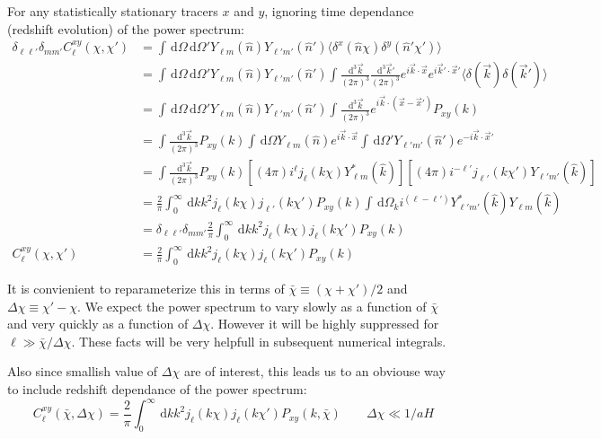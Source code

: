 \documentclass[onecolumn,prd,nofootinbib]{revtex4-1}
\newcommand{\ud}{\,\mathrm{d}}
\begin{document}
For any statistically stationary tracers $x$ and $y$,
ignoring time dependance (redshift evolution)
of the power spectrum:
\begin{align}
    \delta_{\ell\ell'}\delta_{mm'}C^{xy}_\ell(\chi, \chi')
    &= \int\ud\Omega\ud\Omega'Y_{\ell m}(\hat n) Y_{\ell' m'}(\hat n')
        \langle \delta^x(\hat n \chi) \delta^y(\hat n' \chi') \rangle
        \\
    &=
        \int\ud\Omega\ud\Omega'Y_{\ell m}(\hat n) Y_{\ell' m'}(\hat n')
        \int\frac{\ud^3\vec k}{(2 \pi)^3} \frac{\ud^3\vec k'}{(2 \pi)^3}
        e^{i\vec k \cdot \vec x} e^{i\vec k' \cdot \vec x'}
        \langle \delta(\vec k) \delta(\vec k') \rangle
        \\
    &=
        \int\ud\Omega\ud\Omega'Y_{\ell m}(\hat n) Y_{\ell' m'}(\hat n')
        \int\frac{\ud^3\vec k}{(2 \pi)^3} 
        e^{i\vec k \cdot (\vec x - \vec x')} P_{xy}(k)
        \\
    &=
        \int\frac{\ud^3\vec k}{(2 \pi)^3} P_{xy}(k)
        \int\ud\Omega Y_{\ell m}(\hat n)
        e^{i\vec k \cdot \vec x}
        \int\ud\Omega' Y_{\ell' m'}(\hat n')
        e^{-i\vec k \cdot \vec x'}
        \\
    &=
        \int\frac{\ud^3\vec k}{(2 \pi)^3} P_{xy}(k)
        \left[(4 \pi) i^\ell j_\ell(k\chi) Y_{\ell m}^*(\hat k)\right]
        \left[(4 \pi) i^{-\ell'} j_{\ell'}(k\chi') Y_{\ell' m'}(\hat
        k)\right]
        \\
    &=
        \frac{2}{\pi}
        \int_0^\infty\ud k k^2 j_\ell(k\chi) j_{\ell'}(k\chi')P_{xy}(k)
        \int\ud \Omega_k i^{(\ell - \ell')}
        Y_{\ell' m'}^*(\hat k) Y_{\ell m}(\hat k)
        \\
    &= \delta_{\ell\ell'}\delta_{mm'}\frac{2}{\pi}
        \int_0^\infty\ud k k^2  j_\ell(k\chi) j_{\ell}(k\chi')P_{xy}(k)
        \\
    C^{xy}_\ell(\chi,\chi') 
    &= \frac{2}{\pi}
\int_0^\infty\ud k k^2 j_\ell(k\chi) j_{\ell}(k\chi')P_{xy}(k)
\end{align}

It is convienient to reparameterize this in terms of
$\bar\chi \equiv (\chi + \chi') /2$ and $\Delta \chi \equiv \chi' - \chi$.
We expect the power spectrum to vary slowly as a function of $\bar\chi$ and
very quickly as a function of $\Delta\chi$. However it will be highly
suppressed for $\ell \gg \bar\chi/\Delta\chi$. These facts will be very
helpfull in subsequent numerical integrals.

Also since smallish value of $\Delta\chi$ are of interest, this leads us to
an obviouse way to include redshift dependance of the
power spectrum:
\begin{equation}
C^{xy}_\ell(\bar\chi,\Delta\chi) 
    = \frac{2}{\pi}
    \int_0^\infty\ud k k^2
    j_\ell(k\chi) j_{\ell}(k\chi')
    P_{xy}(k,\bar\chi) \qquad \Delta\chi \ll 1/aH
\end{equation}
\end{document}
